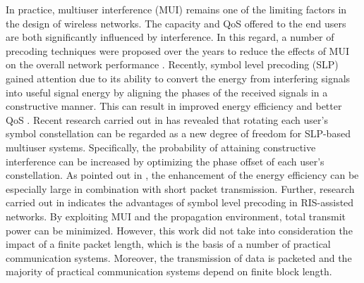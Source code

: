 \documentclass[10pt,conference]{IEEEtran}
\begin{document}
In practice, multiuser interference (MUI) remains one of the limiting factors in the design of wireless networks. The capacity and QoS offered to the end users are both significantly influenced by interference. In this regard, a number of precoding techniques were proposed over the years to reduce the effects of MUI on the overall network performance \cite{joham2005linear}. Recently, symbol level precoding (SLP) gained attention due to its ability to convert the energy from interfering signals into useful signal energy by aligning the phases of the received signals in a constructive manner. This can result in improved energy efficiency and better QoS \cite{alodeh2015constructive,alodeh2018symbol,li2020tutorial}.  Recent research carried out in \cite{kisseleff2021symbol, alodeh2020joint, 9984648} has revealed that rotating each user's symbol constellation can be regarded as a new degree of freedom for SLP-based multiuser systems. Specifically, the probability of attaining constructive interference can be increased by optimizing the phase offset of each user's constellation. As pointed out in \cite{kisseleff2021symbol}, the enhancement of the energy efficiency can be especially large in combination with short packet transmission. Further, research carried out in \cite{liu2020joint} indicates the advantages of symbol level precoding in RIS-assisted networks. By exploiting MUI and the propagation environment, total transmit power can be minimized. However, this work did not take into consideration the impact of a finite packet length, which is the basis of a number of practical communication systems. Moreover, the transmission of data is packeted and the majority of practical communication systems depend on finite block length.   
\end{document}
